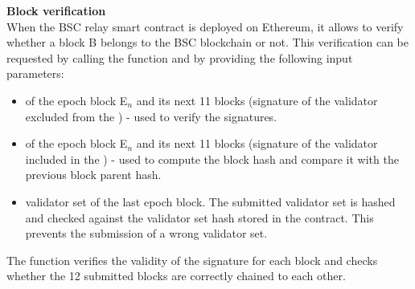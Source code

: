 \noindent
\textbf{Block verification}\\
When the BSC relay smart contract is deployed on Ethereum, it allows to verify whether a block B belongs to the BSC blockchain or not. This verification can be requested by calling the \verify function and by providing the following input parameters:
\begin{itemize}
    \item \rlph of the epoch block E$_n$ and its next 11 blocks (signature of the validator excluded from the \rlph) - used to verify the signatures. 
    \item \rlph of the epoch block E$_n$ and its next 11 blocks (signature of the validator included in the \rlph) - used to compute the block hash and compare it with the previous block parent hash.
    \item validator set of the last epoch block. The submitted validator set is hashed and checked against the validator set hash stored in the contract. This prevents the submission of a wrong validator set.
\end{itemize}
The \verify function verifies the validity of the signature for each block and checks whether the 12 submitted blocks are correctly chained to each other.
